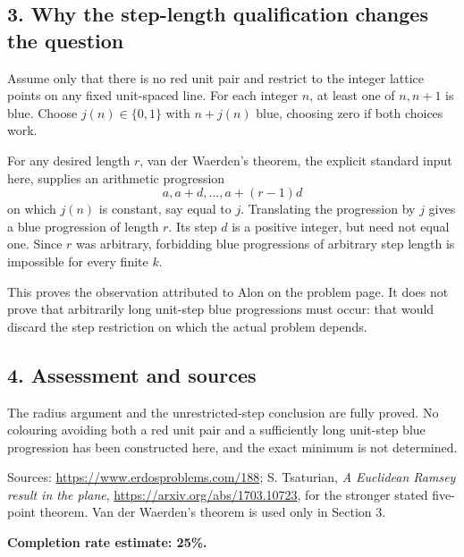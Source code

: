 \subsection*{3. Why the step-length qualification changes the question}
Assume only that there is no red unit pair and restrict to the integer lattice points on any fixed unit-spaced line. For each integer $n$, at least one of $n,n+1$ is blue. Choose $j(n)\in\{0,1\}$ with $n+j(n)$ blue, choosing zero if both choices work.

For any desired length $r$, van der Waerden's theorem, the explicit standard input here, supplies an arithmetic progression
\[
 a,a+d,\ldots,a+(r-1)d
\]
on which $j(n)$ is constant, say equal to $j$. Translating the progression by $j$ gives a blue progression of length $r$. Its step $d$ is a positive integer, but need not equal one. Since $r$ was arbitrary, forbidding blue progressions of arbitrary step length is impossible for every finite $k$.

This proves the observation attributed to Alon on the problem page. It does not prove that arbitrarily long unit-step blue progressions must occur: that would discard the step restriction on which the actual problem depends.

\subsection*{4. Assessment and sources}
The radius argument and the unrestricted-step conclusion are fully proved. No colouring avoiding both a red unit pair and a sufficiently long unit-step blue progression has been constructed here, and the exact minimum is not determined.

Sources: \url{https://www.erdosproblems.com/188}; S. Tsaturian, \emph{A Euclidean Ramsey result in the plane}, \url{https://arxiv.org/abs/1703.10723}, for the stronger stated five-point theorem. Van der Waerden's theorem is used only in Section 3.

\textbf{Completion rate estimate: 25\%.}

